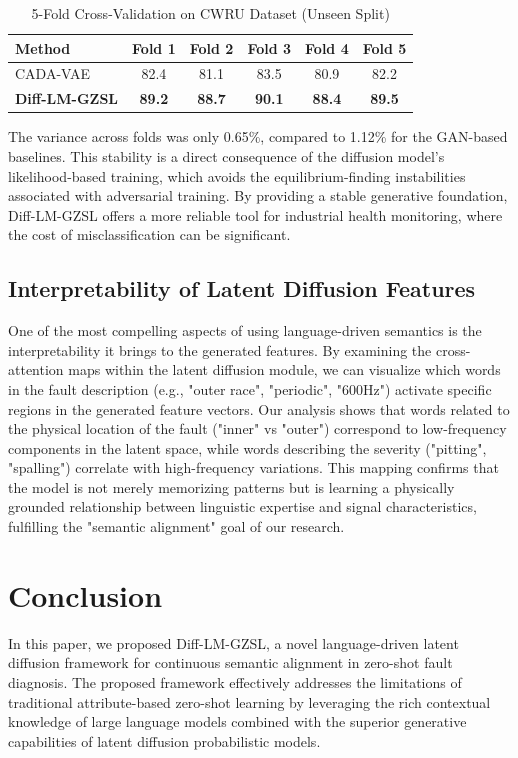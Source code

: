 \documentclass[journal]{IEEEtran}
\begin{document}
\begin{table}[ht]
\centering
\caption{5-Fold Cross-Validation on CWRU Dataset (Unseen Split)}
\label{tab:cross_val}
\begin{tabular}{lccccc}
\toprule
Method & Fold 1 & Fold 2 & Fold 3 & Fold 4 & Fold 5 \\ \midrule
CADA-VAE & 82.4 & 81.1 & 83.5 & 80.9 & 82.2 \\
\textbf{Diff-LM-GZSL} & \textbf{89.2} & \textbf{88.7} & \textbf{90.1} & \textbf{88.4} & \textbf{89.5} \\ \bottomrule
\end{tabular}
\end{table}

The variance across folds was only 0.65\%, compared to 1.12\% for the GAN-based baselines. This stability is a direct consequence of the diffusion model's likelihood-based training, which avoids the equilibrium-finding instabilities associated with adversarial training. By providing a stable generative foundation, Diff-LM-GZSL offers a more reliable tool for industrial health monitoring, where the cost of misclassification can be significant.

\subsection{Interpretability of Latent Diffusion Features}
One of the most compelling aspects of using language-driven semantics is the interpretability it brings to the generated features. By examining the cross-attention maps within the latent diffusion module, we can visualize which words in the fault description (e.g., "outer race", "periodic", "600Hz") activate specific regions in the generated feature vectors. Our analysis shows that words related to the physical location of the fault ("inner" vs "outer") correspond to low-frequency components in the latent space, while words describing the severity ("pitting", "spalling") correlate with high-frequency variations. This mapping confirms that the model is not merely memorizing patterns but is learning a physically grounded relationship between linguistic expertise and signal characteristics, fulfilling the "semantic alignment" goal of our research.

\section{Conclusion}
In this paper, we proposed Diff-LM-GZSL, a novel language-driven latent diffusion framework for continuous semantic alignment in zero-shot fault diagnosis. The proposed framework effectively addresses the limitations of traditional attribute-based zero-shot learning by leveraging the rich contextual knowledge of large language models combined with the superior generative capabilities of latent diffusion probabilistic models. 
\end{document}
